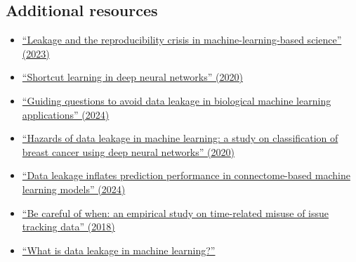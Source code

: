 \documentclass[letterpaper, 12pt]{article}
\begin{document}
\subsection*{Additional resources}

\begin{itemize}
    \setlength\itemsep{-0.5em}
     \item \href{https://doi.org/10.1016/j.patter.2023.100804}{``Leakage and the reproducibility crisis in machine-learning-based science'' (2023)}
     \item \href{https://doi.org/10.1038/s42256-020-00257-z}{``Shortcut learning in deep neural networks'' (2020)}
     \item \href{https://doi.org/10.1038/s41592-024-02362-y}{``Guiding questions to avoid data leakage in biological machine learning applications'' (2024)}
     \item \href{https://doi.org/10.1117/12.2549313}{``Hazards of data leakage in machine learning: a study on classification of breast cancer using deep neural networks'' (2020)}
     \item \href{https://doi.org/10.1038/s41467-024-46150-w}{``Data leakage inflates prediction performance in connectome-based machine learning models'' (2024)}
     \item \href{https://doi.org/10.1145/3236024.3236054}{``Be careful of when: an empirical study on time-related misuse of issue tracking data'' (2018)}
     \item \href{https://www.ibm.com/think/topics/data-leakage-machine-learning}{``What is data leakage in machine learning?''}
\end{itemize}
\end{document}
